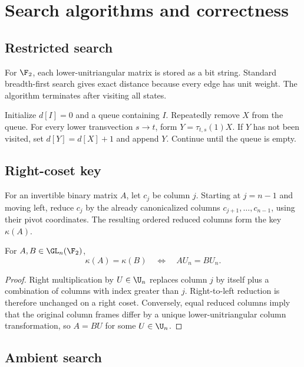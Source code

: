 \section{Search algorithms and correctness}\label{app:algorithms}

\subsection{Restricted search}

For $\F_2$, each lower-unitriangular matrix is stored as a bit string.  Standard breadth-first search gives exact distance because every edge has unit weight.  The algorithm terminates after visiting all states.

\begin{algorithm}
Initialize $d[I]=0$ and a queue containing $I$.  Repeatedly remove $X$ from the queue.  For every lower transvection $s\to t$, form $Y=\tau_{t,s}(1)X$.  If $Y$ has not been visited, set $d[Y]=d[X]+1$ and append $Y$.  Continue until the queue is empty.
\end{algorithm}

\subsection{Right-coset key}

For an invertible binary matrix $A$, let $c_j$ be column $j$.  Starting at $j=n-1$ and moving left, reduce $c_j$ by the already canonicalized columns $c_{j+1},\ldots,c_{n-1}$, using their pivot coordinates.  The resulting ordered reduced columns form the key $\kappa(A)$.

\begin{lemma}
For $A,B\in\GL_n(\F_2)$,
\[
\kappa(A)=\kappa(B)
\quad\Longleftrightarrow\quad
AU_n=BU_n.
\]
\end{lemma}

\begin{proof}
Right multiplication by $U\in\U_n$ replaces column $j$ by itself plus a combination of columns with index greater than $j$.  Right-to-left reduction is therefore unchanged on a right coset.  Conversely, equal reduced columns imply that the original column frames differ by a unique lower-unitriangular column transformation, so $A=BU$ for some $U\in\U_n$.
\end{proof}

\subsection{Ambient search}

